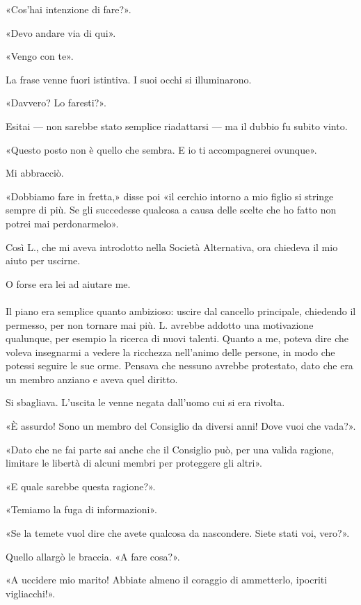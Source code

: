 \documentclass[a4paper,12pt]{book}
\begin{document}
«Cos'hai intenzione di fare?».

«Devo andare via di qui».

«Vengo con te».

La frase venne fuori istintiva. I suoi occhi si illuminarono.

«Davvero? Lo faresti?».

Esitai --- non sarebbe stato semplice riadattarsi --- ma il dubbio fu subito
vinto.

«Questo posto non è quello che sembra. E io ti accompagnerei ovunque».

Mi abbracciò.

«Dobbiamo fare in fretta,» disse poi «il cerchio intorno a mio figlio si stringe
sempre di più. Se gli succedesse qualcosa a causa delle scelte che ho fatto non
potrei mai perdonarmelo».

Così L., che mi aveva introdotto nella Società Alternativa, ora chiedeva il mio
aiuto per uscirne.

O forse era lei ad aiutare me.

\paragraph{}
Il piano era semplice quanto ambizioso: uscire dal cancello principale,
chiedendo il permesso, per non tornare mai più. L. avrebbe addotto una
motivazione qualunque, per esempio la ricerca di nuovi talenti. Quanto a me,
poteva dire che voleva insegnarmi a vedere la ricchezza nell'animo delle
persone, in modo che potessi seguire le sue orme. Pensava che nessuno avrebbe
protestato, dato che era un membro anziano e aveva quel diritto.

Si sbagliava. L'uscita le venne negata dall'uomo cui si era rivolta.

«È assurdo! Sono un membro del Consiglio da diversi anni! Dove vuoi che vada?».

«Dato che ne fai parte sai anche che il Consiglio può, per una valida ragione,
limitare le libertà di alcuni membri per proteggere gli altri».

«E quale sarebbe questa ragione?».

«Temiamo la fuga di informazioni».

«Se la temete vuol dire che avete qualcosa da nascondere. Siete stati voi,
vero?».

Quello allargò le braccia. «A fare cosa?».

«A uccidere mio marito! Abbiate almeno il coraggio di ammetterlo, ipocriti
vigliacchi!».
\end{document}
